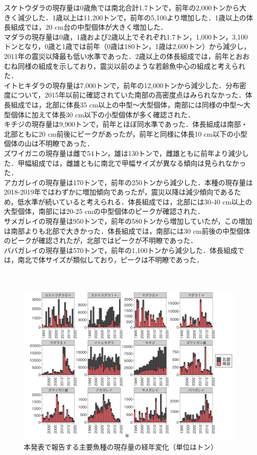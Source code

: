 \documentclass[12pt]{article}
\begin{document}
スケトウダラの現存量は0歳魚では南北合計1.7トンで，前年の2,000トンから大きく減少した．1歳以上は11,200トンで，前年の5,100より増加した．1歳以上の体長組成では，20 cm台の中型個体が大きく増加した．
\ \\
\hspace{20pt}マダラの現存量は0歳，1歳および2歳以上でそれぞれ1.7トン，1,000トン，3,100トンとなり，0歳と1歳では前年（0歳は180トン，1歳は2,600トン）から減少し，2011年の震災以降最も低い水準であった．2歳以上の体長組成では，前年とおおむね同様の組成を示しており，震災以前のような若齢魚中心の組成と考えられた．
\ \\
\hspace{20pt}イトヒキダラの現存量は7,000トンで，前年の12,000トンから減少した．分布密度について，2015年以前に確認されていた南部の高密度点はみられなかった．体長組成では，北部に体長35 cm以上の中型～大型個体，南部には同様の中型～大型個体に加えて体長30 cm以下の小型個体が多く確認された．
\ \\
\hspace{20pt}キチジの現存量は9,900トンで，前年とほぼ同水準であった．体長組成は南部・北部ともに20 cm前後にピークがあったが，前年と同様に体長10 cm以下の小型個体の山は不明瞭であった．
\ \\
\hspace{20pt}ズワイガニの現存量は雌で54トン，雄は130トンで，雌雄ともに前年より減少した．甲幅組成では，雌雄ともに南北で甲幅サイズが異なる傾向は見られなかった．
\ \\
\hspace{20pt}アカガレイの現存量は170トンで，前年の250トンから減少した．本種の現存量は2018-2019年ではわずかに増加傾向であったが，震災以降は減少傾向であるため，低水準が続いていると考えられる．体長組成では，北部には30-40 cm以上の大型個体，南部には20-25 cmの中型個体のピークが確認された．
\ \\
\hspace{20pt}サメガレイの現存量は950トンで，前年の580トンから増加していたが，この増加は南部よりも北部で大きかった．体長組成では，南部には30 cm前後の中型個体のピークが確認されたが，北部ではピークが不明瞭であった．
\ \\
\hspace{20pt}ババガレイの現存量は570トンで，前年の1,100トンから減少した．体長組成では，南北で体サイズが類似しており，ピークは不明瞭であった．
\ \\
\ \\
\ \\
\begin{figure}[h]
  \centering
  \includegraphics[width = 18cm]{trendabst.png}
  \caption{本発表で報告する主要魚種の現存量の経年変化（単位はトン）}
\end{figure}
\end{document}

